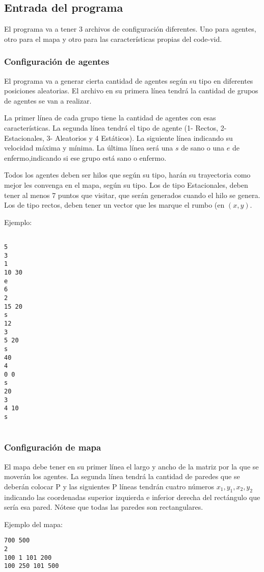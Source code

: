 \documentclass[11pt]{article}
\begin{document}
\subsection{Entrada del programa}
El programa va a tener 3 archivos de configuración diferentes. Uno para agentes, otro para el mapa y otro para las características propias del code-vid.

\subsubsection{Configuración de agentes}
El programa va a generar cierta cantidad de agentes según su tipo en diferentes posiciones aleatorias.
El archivo en su primera línea tendrá la cantidad de grupos de agentes se van a realizar.

La primer línea de cada grupo tiene la cantidad de agentes con esas características. La segunda línea tendrá el tipo de agente (1- Rectos, 2- Estacionales, 3- Aleatorios y 4 Estáticos). La siguiente línea indicando su velocidad máxima y mínima. La última línea será una $s$ de sano o una $e$ de enfermo,indicando si ese grupo está sano o enfermo.

Todos los agentes deben ser hilos que según su tipo, harán su trayectoria como mejor les convenga en el mapa, según su tipo. Los de tipo Estacionales, deben tener al menos 7 puntos que visitar, que serán generados cuando el hilo se genera. Los de tipo rectos, deben tener un vector que les marque el rumbo (en $(x,y)$. 

Ejemplo:

\begin{verbatim}

5
3
1
10 30
e
6
2
15 20
s
12
3
5 20
s
40
4
0 0 
s
20
3
4 10
s


\end{verbatim}


\subsubsection{Configuración de mapa}
El mapa debe tener en su primer línea el largo y ancho de la matriz por la que se moverán los agentes. La segunda línea tendrá la cantidad de paredes que se deberán colocar P y las siguientes P líneas tendrán cuatro números $x_1,  y_1, x_2,y_2$ indicando las coordenadas superior izquierda e inferior derecha del rectángulo que sería esa pared. Nótese que todas las paredes son rectangulares.

Ejemplo del mapa:
\begin{verbatim}
700 500
2
100 1 101 200
100 250 101 500
\end{verbatim}
\end{document}
